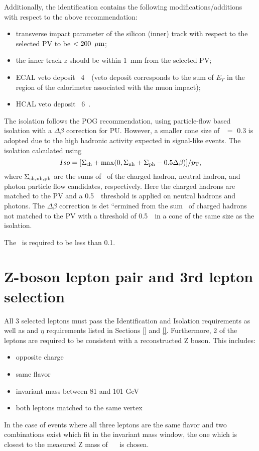 Additionally, the identification contains the following modifications/additions with respect to the above recommendation:

\begin{itemize}
\item transverse impact parameter of the silicon (inner) track with respect to the selected PV to be $<200~\,\mu\text{m}$;
\item the inner track $z$ should be within 1~mm from the selected PV;
\item ECAL veto deposit \lt\ 4~\GeV\ (veto deposit corresponds to the sum of $E_T$ in the region of the calorimeter
associated with the muon impact);
\item HCAL veto deposit \lt\ 6~\GeV.
\end{itemize}

The isolation follows the POG recommendation, using particle-flow based isolation with a $\Delta\beta$ correction for PU.  
However, a smaller cone size of \DR\ $=$ 0.3 is adopted due to the high hadronic activity expected in signal-like events.  
The isolation calculated using 
$$
Iso = [ \Sigma_{\rm ch} + {\rm max}(0, \Sigma_{\rm nh} + \Sigma_{\rm ph} - 0.5 \Delta\beta) ]/p_{\mathrm{T}},
$$
where $\Sigma_{\rm ch, nh, ph}$ are the sums of \pt\ of the charged hadron, neutral hadron, and photon particle flow candidates, respectively.
Here the charged hadrons are matched to the PV and a 0.5~\GeV\ threshold is applied on neutral hadrons and photons.  
The $\Delta\beta$ correction is det	``ermined from the sum \pt\ of charged hadrons not matched to the PV with a threshold of 0.5~\GeV\ in a cone of the same size as the isolation.  
 
The \relIso\ is required to be less than 0.1.


\section{Z-boson lepton pair and 3rd lepton selection}
\label{sec:3LepSelection}
All 3 selected leptons must pass the Identification and Isolation requirements as well as \pt and $\eta$ requirements listed in Sections \ref{} and \ref{}. Furthermore, 2 of the leptons are required to be consistent with a reconstructed Z boson. This includes:
\begin{itemize}
\item opposite charge
\item same flavor
\item invariant mass between 81 and 101 GeV
\item both leptons matched to the same vertex
\end{itemize}
In the case of events where all three leptons are the same flavor and two combinations exist which fit in the invariant mass window, the one which is closest to the measured Z mass of \zmass \ ~\cite{pdg} is chosen.\\

